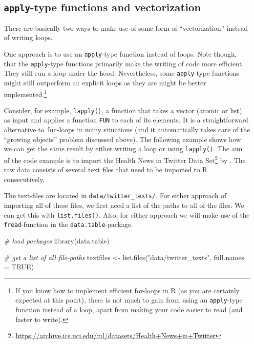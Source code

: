 \documentclass[
  12pt,
]{style/krantz}
\newenvironment{Shaded}{\begin{snugshade}}{\end{snugshade}}
\newcommand{\AttributeTok}[1]{\textcolor[rgb]{0.77,0.63,0.00}{#1}}
\newcommand{\CommentTok}[1]{\textcolor[rgb]{0.56,0.35,0.01}{\textit{#1}}}
\newcommand{\ConstantTok}[1]{\textcolor[rgb]{0.00,0.00,0.00}{#1}}
\newcommand{\FunctionTok}[1]{\textcolor[rgb]{0.00,0.00,0.00}{#1}}
\newcommand{\NormalTok}[1]{#1}
\newcommand{\OtherTok}[1]{\textcolor[rgb]{0.56,0.35,0.01}{#1}}
\newcommand{\StringTok}[1]{\textcolor[rgb]{0.31,0.60,0.02}{#1}}
\renewcommand{\href}[2]{#2\footnote{\url{#1}}}
\begin{document}
\hypertarget{apply-type-functions-and-vectorization}{%
\subsection{\texorpdfstring{\texttt{apply}-type functions and vectorization}{apply-type functions and vectorization}}\label{apply-type-functions-and-vectorization}}

There are basically two ways to make use of some form of ``vectorization'' instead of writing loops.

One approach is to use an \texttt{apply}-type function instead of loops. Note though, that the \texttt{apply}-type functions primarily make the writing of code more efficient. They still run a loop under the hood. Nevertheless, some \texttt{apply}-type functions might still outperform an explicit loops as they are might be better implemented.\footnote{If you know how to implement efficient for-loops in R (as you are certainly expected at this point), there is not much to gain from using an \texttt{apply}-type function instead of a loop, apart from making your code easier to read (and faster to write).}

Consider, for example, \texttt{lapply()}, a function that takes a vector (atomic or list) as input and applies a function \texttt{FUN} to each of its elements. It is a straightforward alternative to \texttt{for}-loops in many situations (and it automatically takes care of the ``growing objects'' problem discussed above). The following example shows how we can get the same result by either writing a loop or using \texttt{lapply()}. The aim of the code example is to import the \href{https://archive.ics.uci.edu/ml/datasets/Health+News+in+Twitter}{Health News in Twitter Data Set} by \citet{karami_etal2017}. The raw data consists of several text files that need to be imported to R consecutively.

The text-files are located in \texttt{data/twitter\_texts/}. For either approach of importing all of these files, we first need a list of the paths to all of the files. We can get this with \texttt{list.files()}. Also, for either approach we will make use of the \texttt{fread}-function in the \texttt{data.table}-package.

\begin{Shaded}
\begin{Highlighting}[]
\CommentTok{\# load packages}
\FunctionTok{library}\NormalTok{(data.table)}

\CommentTok{\# get a list of all file{-}paths}
\NormalTok{textfiles }\OtherTok{\textless{}{-}} \FunctionTok{list.files}\NormalTok{(}\StringTok{"data/twitter\_texts"}\NormalTok{, }\AttributeTok{full.names =} \ConstantTok{TRUE}\NormalTok{)}
\end{Highlighting}
\end{Shaded}
\end{document}
